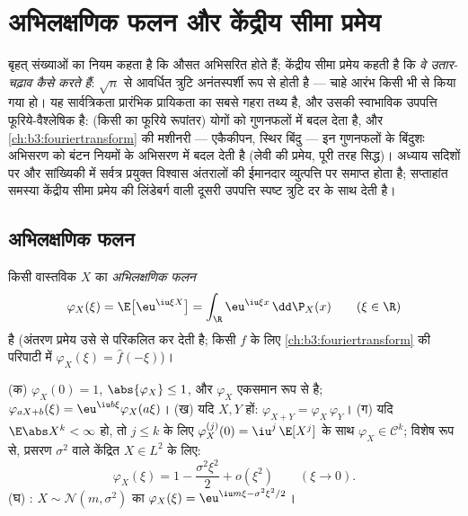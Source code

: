 \chapter{अभिलक्षणिक फलन और केंद्रीय सीमा
प्रमेय}\label{ch:b3:clt}

बृहत् संख्याओं का नियम कहता है कि औसत अभिसरित होते हैं; केंद्रीय
सीमा प्रमेय कहती है कि \emph{वे उतार-चढ़ाव कैसे करते हैं}: $\sqrt n$ से
आवर्धित त्रुटि अनंतस्पर्शी रूप से  होती है --- चाहे आरंभ किसी
भी  से किया गया हो। यह सार्वत्रिकता प्रारंभिक प्रायिकता का
सबसे गहरा तथ्य है, और उसकी स्वाभाविक उपपत्ति फूरिये-वैश्लेषिक है:
\emph{} (किसी  का फूरिये रूपांतर) 
योगों को गुणनफलों में बदल देता है, और \cref{ch:b3:fouriertransform} की मशीनरी --- एकैकीपन,
 स्थिर बिंदु --- इन गुणनफलों के बिंदुशः अभिसरण को बंटन नियमों
के अभिसरण में बदल देती है (लेवी की प्रमेय, पूरी तरह सिद्ध)। अध्याय
 सदिशों पर और सांख्यिकी में सर्वत्र प्रयुक्त विश्वास अंतरालों
की ईमानदार व्युत्पत्ति पर समाप्त होता है; सप्ताहांत समस्या केंद्रीय
सीमा प्रमेय की लिंडेबर्ग वाली दूसरी उपपत्ति स्पष्ट त्रुटि दर के साथ
देती है।

\section{अभिलक्षणिक फलन}

\begin{definition}\label{def:b3:clt:cf}
किसी वास्तविक  $X$ का \emph{अभिलक्षणिक
फलन}
\[
\varphi_X(\xi) = \E\bigl[\eu^{\iu\xi X}\bigr]
= \int_\R \eu^{\iu\xi x}\,\dd\P_X(x)
\qquad (\xi \in \R)
\]
है (अंतरण प्रमेय उसे  से परिकलित कर देती है; किसी 
$f$ के लिए \cref{ch:b3:fouriertransform} की परिपाटी में $\varphi_X(\xi) = \hat f(-\xi)$)।
\end{definition}

\begin{proposition}\label{prop:b3:clt:cfbasics}
(क) $\varphi_X(0) = 1$, $\abs{\varphi_X} \leq 1$, और $\varphi_X$ एकसमान रूप से  है; $\varphi_{aX + b}(\xi) = \eu^{\iu b\xi}\varphi_X(a\xi)$।
(ख) यदि $X, Y$ \emph{} हों: $\varphi_{X+Y} = \varphi_X\,\varphi_Y$।
(ग) यदि $\E\abs X^k < \infty$ हो, तो $j \leq
k$ के लिए $\varphi_X^{(j)}(0) = \iu^j\,\E[X^j]$ के साथ $\varphi_X \in \mathcal
C^k$; विशेष रूप से,
प्रसरण $\sigma^2$ वाले केंद्रित $X \in L^2$ के लिए:
\[
\varphi_X(\xi) = 1 - \frac{\sigma^2\xi^2}{2} +
o(\xi^2) \qquad (\xi \to 0).
\]
(घ) : $X \sim \mathcal N(m, \sigma^2)$ का $\varphi_X(\xi) = \eu^{\iu m\xi - \sigma^2\xi^2/2}$।
\end{proposition}

